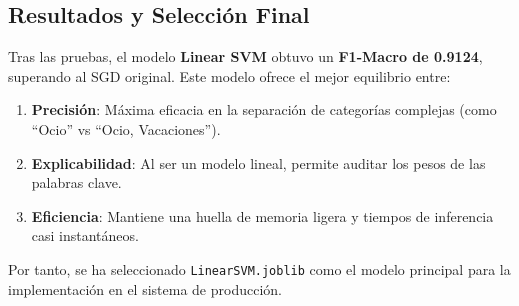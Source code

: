 \subsection{Resultados y Selección Final}
Tras las pruebas, el modelo \textbf{Linear SVM} obtuvo un \textbf{F1-Macro de 0.9124}, superando al SGD original. Este modelo ofrece el mejor equilibrio entre:
\begin{enumerate}
    \item \textbf{Precisión}: Máxima eficacia en la separación de categorías complejas (como ``Ocio'' vs ``Ocio, Vacaciones'').
    \item \textbf{Explicabilidad}: Al ser un modelo lineal, permite auditar los pesos de las palabras clave.
    \item \textbf{Eficiencia}: Mantiene una huella de memoria ligera y tiempos de inferencia casi instantáneos.
\end{enumerate}

Por tanto, se ha seleccionado \texttt{LinearSVM.joblib} como el modelo principal para la implementación en el sistema de producción.
